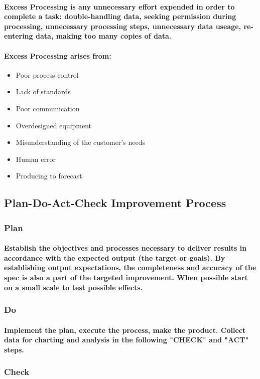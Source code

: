 \documentclass{acm_proc_article-sp}
\begin{document}
\paragraph{Excess Processing is any unnecessary effort expended in order to complete a task: double-handling data, seeking permission during processing, unnecessary processing steps, unnecessary data useage, re-entering data, making too many copies of data.}
\paragraph{Excess Processing arises from:}
\begin{itemize}
\item Poor process control
\item Lack of standards
\item Poor communication
\item Overdesigned equipment
\item Misunderstanding of the customer's needs
\item Human error
\item Producing to forecast
\end{itemize}
\subsection{Plan-Do-Act-Check Improvement Process}
\subsubsection{Plan}
\paragraph{Establish the objectives and processes necessary to deliver results in accordance with the expected output (the target or goals). By establishing output expectations, the completeness and accuracy of the spec is also a part of the targeted improvement. When possible start on a small scale to test possible effects.}
\subsubsection{Do}
\paragraph{Implement the plan, execute the process, make the product. Collect data for charting and analysis in the following "CHECK" and "ACT" steps.}
\subsubsection{Check}
\end{document}
